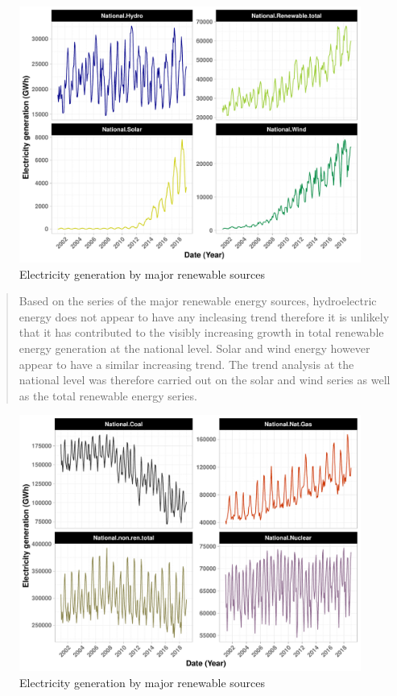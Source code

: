\documentclass[12pt,]{article}
\begin{document}
\begin{figure}
\centering
\includegraphics{Kara_ENV872_Project_files/figure-latex/unnamed-chunk-18-1.pdf}
\caption{Electricity generation by major renewable sources}
\end{figure}

\begin{quote}
Based on the series of the major renewable energy sources, hydroelectric
energy does not appear to have any incleasing trend therefore it is
unlikely that it has contributed to the visibly increasing growth in
total renewable energy generation at the national level. Solar and wind
energy however appear to have a similar increasing trend. The trend
analysis at the national level was therefore carried out on the solar
and wind series as well as the total renewable energy series.
\end{quote}

\begin{figure}
\centering
\includegraphics{Kara_ENV872_Project_files/figure-latex/unnamed-chunk-20-1.pdf}
\caption{Electricity generation by major renewable sources}
\end{figure}
\end{document}
